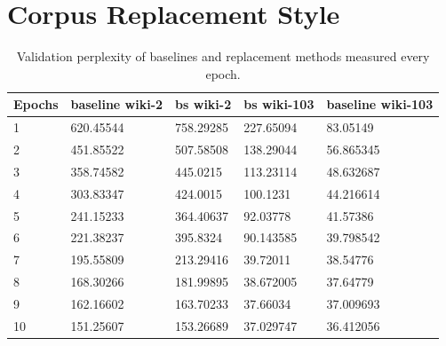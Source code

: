 \documentclass [11pt, proquest] {uwthesis}[2020/12/20]
\begin{document}
\section{Corpus Replacement Style}
\begin{table}[!h]
\begin{tabular}{|l|l|l|l|l|}
\hline 
Epochs & baseline wiki-2 & bs wiki-2 & bs wiki-103 & baseline wiki-103 \\ \hline \hline  
1  & 620.45544 & 758.29285 & 227.65094 & 83.05149  \\ \hline 
2  & 451.85522 & 507.58508 & 138.29044 & 56.865345 \\ \hline 
3  & 358.74582 & 445.0215  & 113.23114 & 48.632687 \\ \hline  
4  & 303.83347 & 424.0015  & 100.1231  & 44.216614 \\ \hline  
5  & 241.15233 & 364.40637 & 92.03778  & 41.57386  \\ \hline  
6  & 221.38237 & 395.8324  & 90.143585 & 39.798542 \\ \hline 
7  & 195.55809 & 213.29416 & 39.72011  & 38.54776  \\ \hline  
8  & 168.30266 & 181.99895 & 38.672005 & 37.64779  \\ \hline 
9  & 162.16602 & 163.70233 & 37.66034  & 37.009693 \\ \hline 
10 & 151.25607 & 153.26689 & 37.029747 & 36.412056 \\ \hline 
\end{tabular}
\label{table:corpuscurriculaperplexity}
\caption{Validation perplexity of baselines and replacement methods measured every epoch.}
\end{table}
\end{document}
